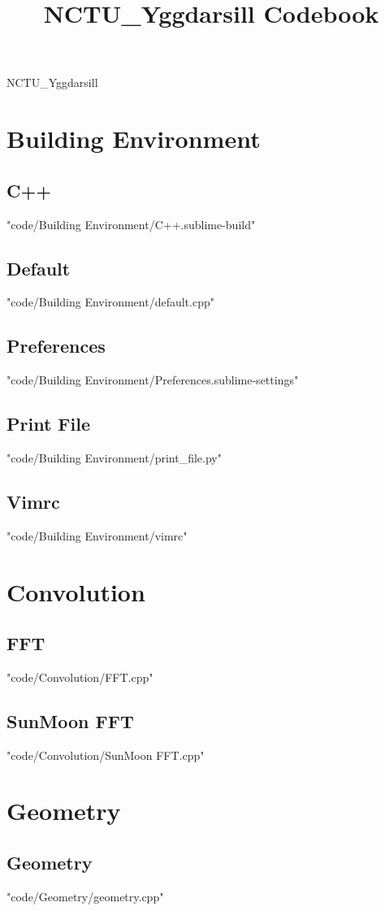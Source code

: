 \documentclass [landscape,8pt,a4paper,twocolumn]{article}
\title {NCTU\_Yggdarsill Codebook}
\begin{document}
\thispagestyle{fancy}
{ \Huge NCTU\_Yggdarsill}
\tableofcontents

\section{Building Environment}
\subsection{C++}
 {"code/Building Environment/C++.sublime-build"}
\subsection{Default}
 {"code/Building Environment/default.cpp"}
\subsection{Preferences}
 {"code/Building Environment/Preferences.sublime-settings"}
\subsection{Print File}
 {"code/Building Environment/print_file.py"}
\subsection{Vimrc}
 {"code/Building Environment/vimrc"}
\section{Convolution}
\subsection{FFT}
 {"code/Convolution/FFT.cpp"}
\subsection{SunMoon FFT}
 {"code/Convolution/SunMoon FFT.cpp"}
\section{Geometry}
\subsection{Geometry}
 {"code/Geometry/geometry.cpp"}
\end{document}
